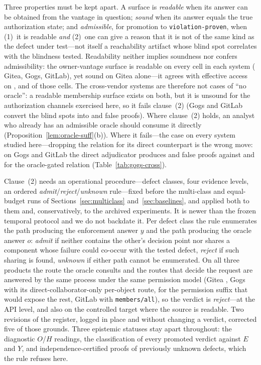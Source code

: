 Three properties must be kept apart. A surface is \emph{readable} when its answer can be
obtained from the vantage in question; \emph{sound} when its answer equals the true
authorization state; and \emph{admissible}, for promotion to \texttt{violation-proven},
when (1)~it is readable \emph{and} (2)~one can give a reason that it is not of the same
kind as the defect under test---not itself a reachability artifact whose blind spot
correlates with the blindness tested. Readability neither implies soundness nor confers
admissibility: the owner-vantage surface is readable on every cell in each system
(\ResRsCellsSnapshot{} Gitea, \GgCells{} Gogs, \GlCells{} GitLab), yet sound on Gitea
alone---it agrees with effective access on \GtOracleAgree{}, \GgOracleAgree{} and
\GlOracleAgree{} of those cells. The cross-vendor systems are therefore not cases of ``no
oracle'': a readable membership surface exists on both, but it is unsound for the
authorization channels exercised here, so it fails clause~(2) (Gogs and GitLab convert the
blind spots into \GgFpVthree{} and \GlFpVthree{} false proofs). Where clause~(2) holds, an
analyst who already has an admissible oracle should consume it directly
(Proposition~\ref{lem:oracle-suff}(b)). Where it fails---the case on every system studied
here---dropping the relation for its direct counterpart is the wrong move: on Gogs
\GgVersion{} and GitLab \GlVersion{} the direct adjudicator produces
\GgFpDirectObserve{} and \GlFpDirectObserve{} false proofs against \GgFpVthree{} and
\GlFpVthree{} for the oracle-gated relation (Table~\ref{tab:gogs-cross}).

Clause~(2) needs an operational procedure---defect classes, four evidence levels, an ordered
\emph{admit}/\emph{reject}/\emph{unknown} rule---fixed before the multi-class and
equal-budget runs of Sections~\ref{sec:multiclass} and~\ref{sec:baselines}, and applied
both to them and, conservatively, to the archived experiments. It is newer than the frozen
temporal protocol and we do not backdate it. Per defect class the rule enumerates the path
producing the enforcement answer $y$ and the path producing the oracle answer $o$:
\emph{admit} if neither contains the other's decision point nor shares a component whose
failure could co-occur with the tested defect, \emph{reject} if such sharing is found,
\emph{unknown} if either path cannot be enumerated. On all three products the route the
oracle consults and the routes that decide the request are answered by the same process
under the same permission model (Gitea \ResRsVersion{}, Gogs \GgVersion{} with its
direct-collaborator-only per-object route, \GgChProbePermSuffix{} for the permission suffix
that would expose the rest, GitLab \GlVersion{} with \texttt{members/all}), so the verdict
is \emph{reject}---at the API level, and also on the controlled target where the source is
readable. Two revisions of the register, logged in place and without changing a verdict,
corrected five of those grounds. Three epistemic statuses stay apart throughout: the
diagnostic $O$/$H$ readings, the classification of every promoted verdict against $E$ and
$Y$, and independence-certified proofs of previously unknown defects, which the rule
refuses here.

